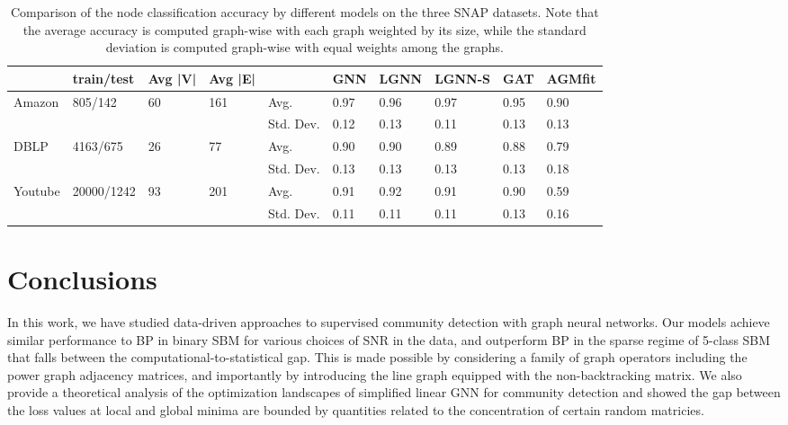 \documentclass{article} \usepackage{iclr2019_conference,times}
\begin{document}
\begin{table}[h]
\centering
{\small 


\begin{tabular}{l|l|l|l|l|l|l|l|l|l}
        & train/test & Avg |V| & Avg |E| &           & GNN  & LGNN & LGNN-S & GAT  & AGMfit \\ \hline
Amazon  & 805/142    & 60       & 161      & Avg.      & 0.97 & 0.96 & 0.97     & 0.95 & 0.90   \\ \cline{5-10} 
        &            &          &          & Std. Dev. & 0.12 & 0.13 & 0.11     & 0.13 & 0.13   \\ \hline
DBLP    & 4163/675   & 26       & 77       & Avg.      & 0.90 & 0.90 & 0.89     & 0.88 & 0.79   \\ \cline{5-10} 
        &            &          &          & Std. Dev. & 0.13 & 0.13 & 0.13     & 0.13 & 0.18   \\ \hline
Youtube & 20000/1242 & 93       & 201      & Avg.      & 0.91 & 0.92 & 0.91     & 0.90 &  0.59      \\ \cline{5-10} 
        &            &          &          & Std. Dev. & 0.11 & 0.11 & 0.11     & 0.13 &  0.16     
\end{tabular}
  }
  \caption{\footnotesize{Comparison of the node classification accuracy by different models on the three SNAP datasets. Note that the average accuracy is computed graph-wise with each graph weighted by its size, while the standard deviation is computed graph-wise with equal weights among the graphs.}}
  \label{sample-table}
  \centering
\end{table} \section{Conclusions}
In this work, we have studied data-driven approaches to supervised community detection with graph neural networks. Our models achieve similar performance to BP in binary SBM for various choices of SNR in the data, and outperform BP in the sparse regime of 5-class SBM that falls between the computational-to-statistical gap. This is made possible by considering a family of graph operators including the power graph adjacency matrices, and importantly by introducing the line graph equipped with the non-backtracking matrix. We also provide a theoretical analysis of the optimization landscapes of simplified linear GNN for community detection and showed the gap between the loss values at local and global minima are bounded by quantities related to the concentration of certain random matricies. 
\end{document}
